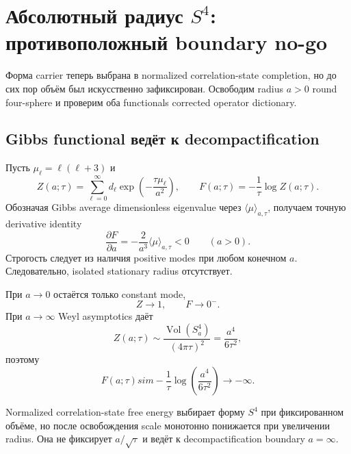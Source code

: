 \chapter{Абсолютный радиус \texorpdfstring{\(S^4\)}{S4}: противоположный boundary no-go}

Форма carrier теперь выбрана в normalized correlation-state completion, но
до сих пор объём был искусственно зафиксирован. Освободим radius \(a>0\)
round four-sphere и проверим оба functionals corrected operator dictionary.

\section{Gibbs functional ведёт к decompactification}

Пусть \(\mu_\ell=\ell(\ell+3)\) и
\begin{equation}
 Z(a;\tau)=\sum_{\ell=0}^\infty
 d_\ell\exp\!\left(-\frac{\tau\mu_\ell}{a^2}\right),
 \qquad
 F(a;\tau)=-\frac1\tau\log Z(a;\tau).
\end{equation}
Обозначая Gibbs average dimensionless eigenvalue через
\(\langle\mu\rangle_{a,\tau}\), получаем точную derivative identity
\begin{equation}
 \frac{\partial F}{\partial a}
 =-\frac{2}{a^3}\langle\mu\rangle_{a,\tau}<0
 \qquad(a>0).
 \label{eq:s4-gibbs-radius-derivative}
\end{equation}
Строгость следует из наличия positive modes при любом конечном \(a\).
Следовательно, isolated stationary radius отсутствует.

При \(a\to0\) остаётся только constant mode,
\begin{equation}
 Z\to1,
 \qquad F\to0^-.
\end{equation}
При \(a\to\infty\) Weyl asymptotics даёт
\begin{equation}
 Z(a;\tau)\sim\frac{\operatorname{Vol}(S^4_a)}{(4\pi\tau)^2}
 =\frac{a^4}{6\tau^2},
\end{equation}
поэтому
\begin{equation}
 F(a;\tau)sim-\frac1\tau
 \log\!\left(\frac{a^4}{6\tau^2}\right)\longrightarrow-\infty.
\end{equation}

\begin{theorem}
Normalized correlation-state free energy выбирает форму \(S^4\) при
фиксированном объёме, но после освобождения scale монотонно понижается при
увеличении radius. Она не фиксирует \(a/\sqrt\tau\) и ведёт к
decompactification boundary \(a=\infty\).
\end{theorem}

